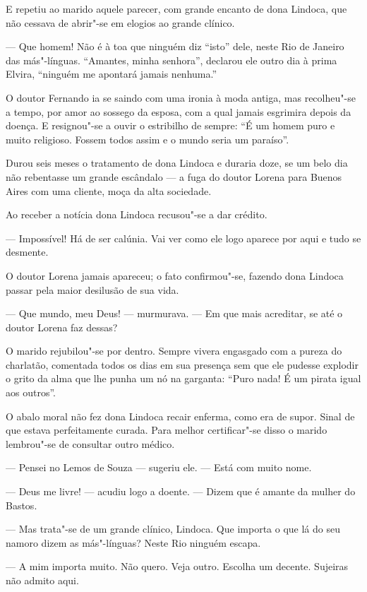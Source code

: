 E repetiu ao marido aquele parecer, com grande encanto de dona Lindoca,
que não cessava de abrir"-se em elogios ao grande clínico.

--- Que homem! Não é à toa que ninguém diz ``isto'' dele, neste Rio de
Janeiro das más"-línguas. ``Amantes, minha senhora'', declarou ele outro
dia à prima Elvira, ``ninguém me apontará jamais nenhuma.''

O doutor Fernando ia se saindo com uma ironia à moda antiga, mas
recolheu"-se a tempo, por amor ao sossego da esposa, com a qual jamais
esgrimira depois da doença. E resignou"-se a ouvir o estribilho de
sempre: ``É um homem puro e muito religioso. Fossem todos assim e o
mundo seria um paraíso''.

Durou seis meses o tratamento de dona Lindoca e duraria doze, se um belo
dia não rebentasse um grande escândalo --- a fuga do doutor Lorena para
Buenos Aires com uma cliente, moça da alta sociedade.

Ao receber a notícia dona Lindoca recusou"-se a dar crédito.

--- Impossível! Há de ser calúnia. Vai ver como ele logo aparece por
aqui e tudo se desmente.

O doutor Lorena jamais apareceu; o fato confirmou"-se, fazendo dona
Lindoca passar pela maior desilusão de sua vida.

--- Que mundo, meu Deus! --- murmurava. --- Em que mais acreditar, se
até o doutor Lorena faz dessas?

O marido rejubilou"-se por dentro. Sempre vivera engasgado com a pureza
do charlatão, comentada todos os dias em sua presença sem que ele
pudesse explodir o grito da alma que lhe punha um nó na garganta: ``Puro
nada! É um pirata igual aos outros''.

O abalo moral não fez dona Lindoca recair enferma, como era de supor.
Sinal de que estava perfeitamente curada. Para melhor certificar"-se
disso o marido lembrou"-se de consultar outro médico.

--- Pensei no Lemos de Souza --- sugeriu ele. --- Está com muito nome.

--- Deus me livre! --- acudiu logo a doente. --- Dizem que é amante da
mulher do Bastos.

--- Mas trata"-se de um grande clínico, Lindoca. Que importa o que lá do
seu namoro dizem as más"-línguas? Neste Rio ninguém escapa.

--- A mim importa muito. Não quero. Veja outro. Escolha um decente.
Sujeiras não admito aqui.

